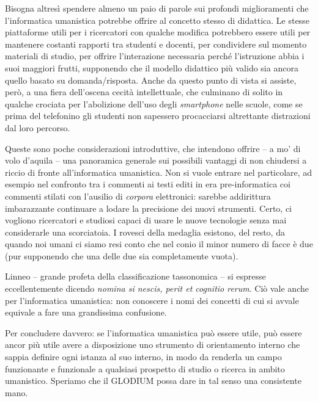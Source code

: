 \documentclass[
  b5paper,
  twoside,
  11pt,
  chapterprefix=false,
  bibliography=totocnumbered,
  listof=flat]{scrbook}
\begin{document}
Bisogna altresì spendere almeno un paio di parole sui profondi
miglioramenti che l'informatica umanistica potrebbe offrire al concetto
stesso di didattica. Le stesse piattaforme utili per i ricercatori con
qualche modifica potrebbero essere utili per mantenere costanti rapporti
tra studenti e docenti, per condividere sul momento materiali di studio,
per offrire l'interazione necessaria perché l'istruzione abbia i suoi
maggiori frutti, supponendo che il modello didattico più valido sia
ancora quello basato su domanda/risposta. Anche da questo punto di vista
si assiste, però, a una fiera dell'oscena cecità intellettuale, che
culminano di solito in qualche crociata per l'abolizione dell'uso degli
\emph{smartphone} nelle scuole, come se prima del telefonino gli studenti non
sapessero procacciarsi altrettante distrazioni dal loro percorso.

Queste sono poche considerazioni introduttive, che intendono offrire --
a mo' di volo d'aquila -- una panoramica generale sui possibili vantaggi
di non chiudersi a riccio di fronte all'informatica umanistica. Non si
vuole entrare nel particolare, ad esempio nel confronto tra i commenti
ai testi editi in era pre-informatica coi commenti stilati con l'ausilio
di \emph{corpora} elettronici: sarebbe addirittura imbarazzante continuare a
lodare la precisione dei nuovi strumenti. Certo, ci vogliono ricercatori
e studiosi capaci di usare le nuove tecnologie senza mai considerarle
una scorciatoia. I rovesci della medaglia esistono, del resto, da quando
noi umani ci siamo resi conto che nel conio il minor numero di facce è
due (pur supponendo che una delle due sia completamente vuota).

Linneo -- grande profeta della classificazione tassonomica -- si
espresse eccellentemente dicendo \emph{nomina si nescis, perit et cognitio
rerum}. Ciò vale anche per l'informatica umanistica: non conoscere i
nomi dei concetti di cui si avvale equivale a fare una grandissima
confusione.

Per concludere davvero: se l'informatica umanistica può essere utile,
può essere ancor più utile avere a disposizione uno strumento di
orientamento interno che sappia definire ogni istanza al suo interno, in
modo da renderla un campo funzionante e funzionale a qualsiasi prospetto
di studio o ricerca in ambito umanistico. Speriamo che il GLODIUM possa
dare in tal senso una consistente mano.
\end{document}
